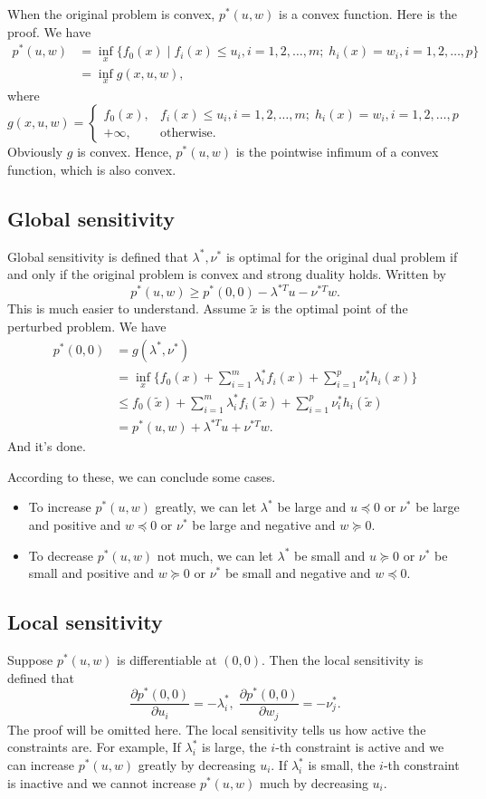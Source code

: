\documentclass[lang=en,color=blue,mode=fancy,titlestyle=hang]{elegantbook}
\begin{document}
When the original problem is convex, $p^*(u, w)$ is a convex function. Here is the proof. We have
\begin{align*}
p^*(u, w) &= \inf_x \{f_0(x) \;|\; f_i(x) \leq u_i, i = 1, 2, \ldots, m; \; h_i(x) = w_i, i = 1, 2, \ldots, p\}\\
&= \inf_x g(x, u, w),
\end{align*}
where \[
g(x, u, w) = \begin{cases}
f_0(x), & f_i(x) \leq u_i, i = 1, 2, \ldots, m; \; h_i(x) = w_i, i = 1, 2, \ldots, p\\
+ \infty, & \text{otherwise}.
\end{cases}
\]
Obviously $g$ is convex. Hence, $p^*(u, w)$ is the pointwise infimum of a  convex function, which is
also convex.

\subsection{Global sensitivity}
Global sensitivity is defined that $\lambda^*, \nu^*$ is optimal for the original dual problem
if and only if the original problem is convex and strong duality holds. Written by
\[
p^*(u, w) \geq p^*(0, 0) - \lambda^{*T} u - \nu^{*T} w.
\]
This is much easier to understand. Assume $\tilde{x}$ is the optimal point of the perturbed problem.
We have
\begin{align*}
p^*(0, 0) &= g(\lambda^*, \nu^*)\\
&= \inf_x \{f_0(x) + \sum_{i=1}^m \lambda_i^* f_i(x) + \sum_{i=1}^p \nu_i^* h_i(x)\}\\
&\leq f_0(\tilde{x}) + \sum_{i=1}^m \lambda_i^* f_i(\tilde{x}) + \sum_{i=1}^p \nu_i^* h_i(\tilde{x})\\
&= p^*(u, w) + \lambda^{*T} u + \nu^{*T} w.
\end{align*}
And it's done.

According to these, we can conclude some cases.
\begin{itemize}
  \item To increase $p^*(u, w)$ greatly, we can let $\lambda^*$ be large and $u \preceq 0$
  or $\nu^*$ be large and positive and $w \preceq 0$ or $\nu^*$ be large and negative and $w \succeq 0$.
  \item To decrease $p^*(u, w)$ not much, we can let $\lambda^*$ be small and $u \succeq 0$
  or $\nu^*$ be small and positive and $w \succeq 0$ or $\nu^*$ be small and negative and $w \preceq 0$.
\end{itemize}

\subsection{Local sensitivity}
Suppose $p^*(u, w)$ is differentiable at $(0, 0)$. Then the local sensitivity is defined that
\[
\frac{\partial p^*(0, 0)}{\partial u_i} = - \lambda^*_i, \; \frac{\partial p^*(0, 0)}{\partial w_j} = - \nu^*_j.
\]
The proof will be omitted here. The local sensitivity tells us how active the constraints are.
For example, If $\lambda_i^*$ is large, the $i$-th constraint is active and we can increase $p^*(u, w)$
greatly by decreasing $u_i$. If $\lambda_i^*$ is small, the $i$-th constraint is inactive and we cannot
increase $p^*(u, w)$ much by decreasing $u_i$.
\end{document}
